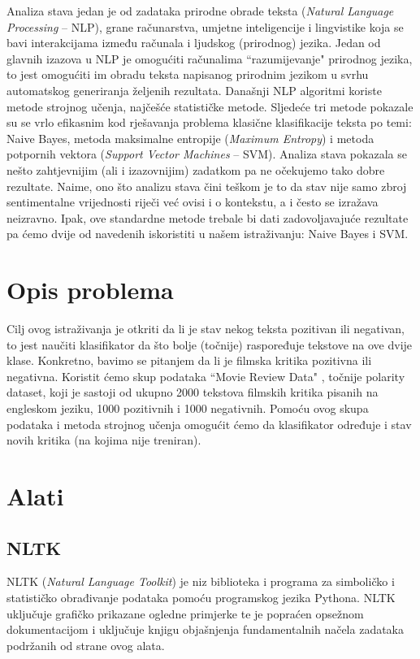 \documentclass[conference]{IEEEtran}
\begin{document}
Analiza stava jedan je od zadataka prirodne obrade teksta (\textit{Natural Language Processing} -- NLP), grane računarstva, umjetne inteligencije i lingvistike koja se bavi interakcijama između računala i ljudskog (prirodnog) jezika. Jedan od glavnih izazova u NLP je omogućiti računalima ``razumijevanje" prirodnog jezika, to jest omogućiti im obradu teksta napisanog prirodnim jezikom u svrhu automatskog generiranja željenih rezultata. Današnji NLP algoritmi koriste metode strojnog učenja, najčešće statističke metode. Sljedeće tri metode pokazale su se vrlo efikasnim kod rješavanja problema klasične klasifikacije teksta po temi: Naive Bayes, metoda maksimalne entropije (\textit{Maximum Entropy}) i metoda potpornih vektora (\textit{Support Vector Machines} -- SVM). Analiza stava pokazala se nešto zahtjevnijim (ali i izazovnijim) zadatkom pa ne očekujemo tako dobre rezultate. Naime, ono što analizu stava čini teškom je to da stav nije samo zbroj sentimentalne vrijednosti riječi već ovisi i o kontekstu, a i često se izražava neizravno. Ipak, ove standardne metode trebale bi dati zadovoljavajuće rezultate pa ćemo dvije od navedenih iskoristiti u našem istraživanju: Naive Bayes i SVM.

\section{Opis problema}

Cilj ovog istraživanja je otkriti da li je stav nekog teksta pozitivan ili negativan, to jest naučiti klasifikator da što bolje (točnije) raspoređuje tekstove na ove dvije klase. Konkretno, bavimo se pitanjem da li je filmska kritika pozitivna ili negativna. Koristit ćemo skup podataka ``Movie Review Data" \cite{dataset}, točnije polarity dataset, koji je sastoji od ukupno 2000 tekstova filmskih kritika pisanih na engleskom jeziku, 1000 pozitivnih i 1000 negativnih. Pomoću ovog skupa podataka i metoda strojnog učenja omogućit ćemo da klasifikator određuje i stav novih kritika (na kojima nije treniran).

\section{Alati}

\subsection{NLTK}

NLTK (\textit{Natural Language Toolkit}) je niz biblioteka i programa za simboličko i statističko obrađivanje podataka pomoću programskog jezika Pythona. NLTK uključuje grafičko prikazane ogledne primjerke te je popraćen opsežnom dokumentacijom i uključuje knjigu \cite{nltk} objašnjenja fundamentalnih načela zadataka podržanih od strane ovog alata.
\end{document}
